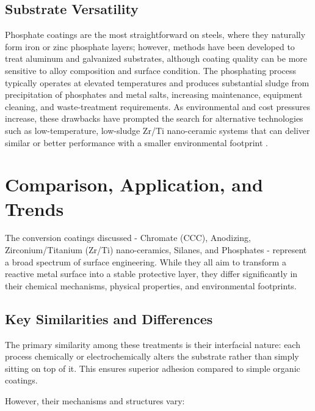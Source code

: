 \documentclass[12pt]{article}
\begin{document}
        \subsection{Substrate Versatility}

            Phosphate coatings are the most straightforward on steels, where they naturally form iron or zinc phosphate layers; however, methods have been developed to treat aluminum and galvanized substrates, although coating quality can be more sensitive to alloy composition and surface condition. The phosphating process typically operates at elevated temperatures and produces substantial sludge from precipitation of phosphates and metal salts, increasing maintenance, equipment cleaning, and waste-treatment requirements. As environmental and cost pressures increase, these drawbacks have prompted the search for alternative technologies such as low-temperature, low-sludge Zr/Ti nano-ceramic systems that can deliver similar or better performance with a smaller environmental footprint \autocite{henkel_metal_nodate}.

    \section{Comparison, Application, and Trends}

        The conversion coatings discussed - Chromate (CCC), Anodizing, Zirconium/Titanium (Zr/Ti) nano-ceramics, Silanes, and Phosphates - represent a broad spectrum of surface engineering. While they all aim to transform a reactive metal surface into a stable protective layer, they differ significantly in their chemical mechanisms, physical properties, and environmental footprints.

        \subsection{Key Similarities and Differences}

            The primary similarity among these treatments is their interfacial nature: each process chemically or electrochemically alters the substrate rather than simply sitting on top of it. This ensures superior adhesion compared to simple organic coatings.

            However, their mechanisms and structures vary:
\end{document}
